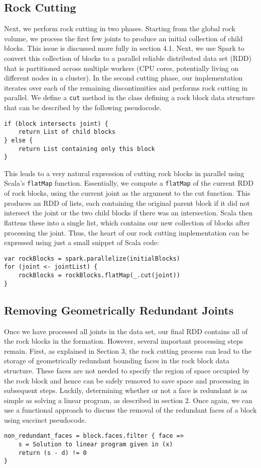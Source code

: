 \subsection{Rock Cutting}
Next, we perform rock cutting in two phases. Starting from the global rock volume, we process the first few joints to produce an initial collection of child blocks. This issue is discussed more fully in section 4.1. Next, we use Spark to convert this collection of blocks to a parallel reliable distributed data set (RDD) that is partitioned across multiple workers (CPU cores, potentially living on different nodes in a cluster). In the second cutting phase, our implementation iterates over each of the remaining discontinuities and performs rock cutting in parallel. We define a \texttt{cut} method in the class defining a rock block data structure that can be described by the following pseudocode.
\begin{verbatim}
if (block intersects joint) {
    return List of child blocks
} else {
    return List containing only this block
}
\end{verbatim}
This leads to a very natural expression of cutting rock blocks in parallel using Scala's \texttt{flatMap} function. Essentially, we compute a \texttt{flatMap} of the current RDD of rock blocks, using the current joint as the argument to the cut function. This produces an RDD of lists, each containing the original parent block if it did not intersect the joint or the two child blocks if there was an intersection. Scala then flattens these into a single list, which contains our new collection of blocks after processing the joint. Thus, the heart of our rock cutting implementation can be expressed using just a small snippet of Scala code:
\begin{verbatim}
var rockBlocks = spark.parallelize(initialBlocks)
for (joint <- jointList) {
    rockBlocks = rockBlocks.flatMap(_.cut(joint))
}
\end{verbatim}

\subsection{Removing Geometrically Redundant Joints}
Once we have processed all joints in the data set, our final RDD contains all of the rock blocks in the formation. However, several important processing steps remain. First, as explained in Section 3, the rock cutting process can lead to the storage of geometrically redundant bounding faces in the rock block data structure. These faces are not needed to specify the region of space occupied by the rock block and hence can be safely removed to save space and processing in subsequent steps. Luckily, determining whether or not a face is redundant is as simple as solving a linear program, as described in section 2. Once again, we can use a functional approach to discuss the removal of the redundant faces of a block using succinct pseudocode.
\begin{verbatim}
non_redundant_faces = block.faces.filter { face =>
    s = Solution to linear program given in (x)
    return (s - d) != 0
}
\end{verbatim}

